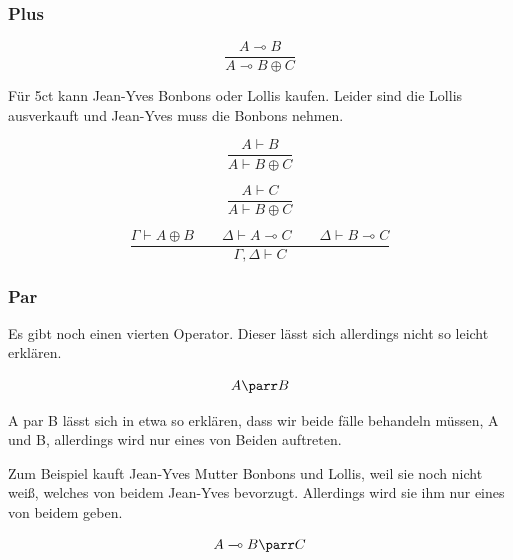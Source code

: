 \documentclass{beamer}
\begin{document}
\begin{frame}
  \frametitle{Plus}
  \begin{equation}
    \frac{A \multimap B}
         {A \multimap B \oplus C}
  \end{equation}

  Für 5ct kann Jean-Yves Bonbons oder Lollis kaufen. Leider sind die Lollis ausverkauft und Jean-Yves muss die Bonbons nehmen.

  \pause%

  \begin{equation}
    \frac{A \vdash B}
         {A \vdash B \oplus C}
  \end{equation}

  \begin{equation}
    \frac{A \vdash C}
         {A \vdash B \oplus C}
  \end{equation}

  \begin{equation}
    \frac{\Gamma \vdash A \oplus B \qquad \Delta \vdash A \multimap C \qquad \Delta \vdash B \multimap C}
         {\Gamma, \Delta \vdash C}
  \end{equation}
\end{frame}

\begin{frame}
  \frametitle{Par}
  Es gibt noch einen vierten Operator. Dieser lässt sich allerdings nicht so leicht erklären.

  \pause%

  \begin{equation*}
    A \parr B
  \end{equation*}

  A par B lässt sich in etwa so erklären, dass wir beide fälle behandeln müssen, A und B, allerdings wird nur eines von Beiden auftreten.

  \pause%

  Zum Beispiel kauft Jean-Yves Mutter Bonbons und Lollis, weil sie noch nicht weiß, welches von beidem Jean-Yves bevorzugt. Allerdings wird sie ihm nur eines von beidem geben.

  \begin{equation*}
    A \multimap B \parr C
  \end{equation*}
\end{frame}
\end{document}
